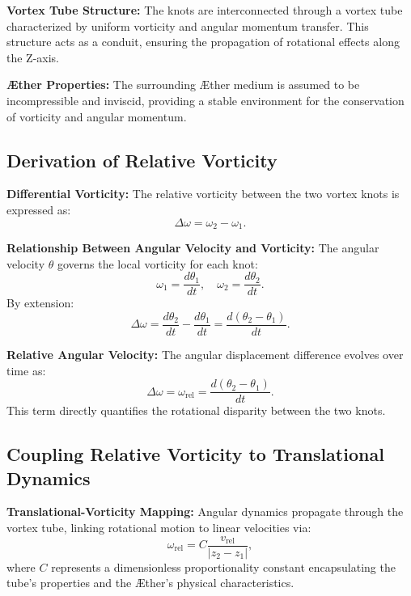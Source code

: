 \documentclass[12pt]{article}
\begin{document}
    \textbf{Vortex Tube Structure:} The knots are interconnected through a vortex tube characterized by uniform vorticity and angular momentum transfer. This structure acts as a conduit, ensuring the propagation of rotational effects along the Z-axis.

    \textbf{Æther Properties:} The surrounding Æther medium is assumed to be incompressible and inviscid, providing a stable environment for the conservation of vorticity and angular momentum.

    \subsection*{Derivation of Relative Vorticity}
    \textbf{Differential Vorticity:} The relative vorticity between the two vortex knots is expressed as:
    \begin{equation*}
        \Delta \omega = \omega_2 - \omega_1.
    \end{equation*}

    \textbf{Relationship Between Angular Velocity and Vorticity:} The angular velocity $\theta$ governs the local vorticity for each knot:
    \begin{equation*}
        \omega_1 = \frac{d\theta_1}{dt}, \quad \omega_2 = \frac{d\theta_2}{dt}.
    \end{equation*}
    By extension:
    \begin{equation*}
        \Delta \omega = \frac{d\theta_2}{dt} - \frac{d\theta_1}{dt} = \frac{d(\theta_2 - \theta_1)}{dt}.
    \end{equation*}

    \textbf{Relative Angular Velocity:} The angular displacement difference evolves over time as:
    \begin{equation*}
        \Delta \omega = \omega_\text{rel} = \frac{d(\theta_2 - \theta_1)}{dt}.
    \end{equation*}
    This term directly quantifies the rotational disparity between the two knots.

    \subsection*{Coupling Relative Vorticity to Translational Dynamics}
    \textbf{Translational-Vorticity Mapping:} Angular dynamics propagate through the vortex tube, linking rotational motion to linear velocities via:
    \begin{equation*}
        \omega_\text{rel} = C \frac{v_\text{rel}}{|z_2 - z_1|},
    \end{equation*}
    where $C$ represents a dimensionless proportionality constant encapsulating the tube's properties and the Æther's physical characteristics.
\end{document}
